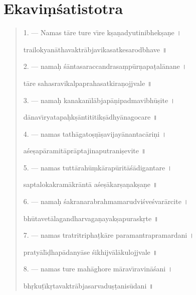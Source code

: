 \documentclass[a4paper, 11pt, oneside, french]{article}
\begin{document}
\section{Ekavi\d{m}\'{s}atistotra}
\begin{quotation}
1. --- Namas t\={a}re ture v\={\i}re k\d{s}a\d{n}adyutinibhek\d{s}a\d{n}e \texthindi{।}

trailokyan\={a}thavaktr\={a}bjavikasatkesarodbhave \texthindi{॥}

\bigskip

2. --- nama\d{h} \'{s}\={a}ntasaraccandrasa\d{m}p\={u}r\d{n}apa\d{t}al\={a}nane \texthindi{।}

t\={a}re sahasravikalpaprahasatkira\d{n}ojjvale \texthindi{॥}

\bigskip

3. --- nama\d{h} kanakan\={\i}l\={a}bjap\={a}\d{n}ipadmavibh\={u}\d{s}ite \texthindi{।}

d\={a}nav\={\i}ryatapa\d{h}k\d{s}\={a}ntititik\d{s}\={a}dhy\={a}nagocare \texthindi{॥}

\bigskip

4. --- namas tath\={a}gato\d{s}\d{n}\={\i}\d{s}avijay\={a}nantac\={a}ri\d{n}i \texthindi{।}

a\'{s}e\d{s}ap\={a}ramit\={a}pr\={a}ptajinaputrani\d{s}evite \texthindi{॥}

\bigskip

5. --- namas tutt\={a}rah\={u}\d{m}k\={a}rap\={u}rit\={a}\'{s}\={a}digantare \texthindi{।}

saptalokakram\={a}kr\={a}nt\={a} a\'{s}e\d{s}\={a}kar\d{s}a\d{n}ak\d{s}a\d{n}e \texthindi{॥}

\bigskip

6. --- nama\d{h} \'{s}akranarabrahmamarudvi\'{s}ve\'{s}var\={a}rcite \texthindi{।}

bh\={u}tavet\={a}lagandharvaga\d{n}ayak\d{s}apurask\d{r}te \texthindi{॥}

\bigskip

7. --- namas tratritripha\d{t}k\={a}re paramantrapramardani \texthindi{।}

praty\={a}l\={\i}\d{d}hap\={a}dany\={a}se \'{s}ikhijv\={a}l\={a}kulojjvale \texthindi{॥}

\bigskip

8. --- namas ture mah\={a}ghore m\={a}rav\={\i}ravin\={a}\'{s}ani \texthindi{।}

bh\d{r}ku\d{t}\={\i}k\d{r}tavaktr\={a}bjasarvadu\d{s}\d{t}anis\={u}dani \texthindi{॥}

\bigskip


\end{quotation}
\end{document}
